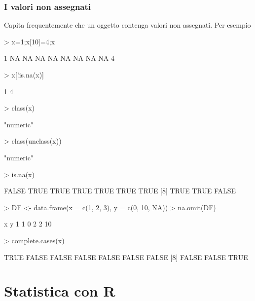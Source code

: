 \documentclass[onecolumn,12pt]{book}
\begin{document}
\subsection{I valori non assegnati}
Capita frequentemente che un oggetto contenga valori non assegnati.
Per esempio
\begin{Schunk}
\begin{Sinput}
> x=1;x[10]=4;x
\end{Sinput}
\begin{Soutput}
 [1]  1 NA NA NA NA NA NA NA NA  4
\end{Soutput}
\end{Schunk}
\begin{Schunk}
\begin{Sinput}
> x[!is.na(x)]
\end{Sinput}
\begin{Soutput}
[1] 1 4
\end{Soutput}
\begin{Sinput}
> class(x)
\end{Sinput}
\begin{Soutput}
[1] "numeric"
\end{Soutput}
\begin{Sinput}
> class(unclass(x))
\end{Sinput}
\begin{Soutput}
[1] "numeric"
\end{Soutput}
\begin{Sinput}
> is.na(x)
\end{Sinput}
\begin{Soutput}
 [1] FALSE  TRUE  TRUE  TRUE  TRUE  TRUE  TRUE
 [8]  TRUE  TRUE FALSE
\end{Soutput}
\begin{Sinput}
>  DF <- data.frame(x = c(1, 2, 3), y = c(0, 10, NA))
> na.omit(DF)
\end{Sinput}
\begin{Soutput}
  x  y
1 1  0
2 2 10
\end{Soutput}
\begin{Sinput}
> complete.cases(x)
\end{Sinput}
\begin{Soutput}
 [1]  TRUE FALSE FALSE FALSE FALSE FALSE FALSE
 [8] FALSE FALSE  TRUE
\end{Soutput}
\end{Schunk}
\chapter{Statistica con \textsf{R}}
\end{document}
